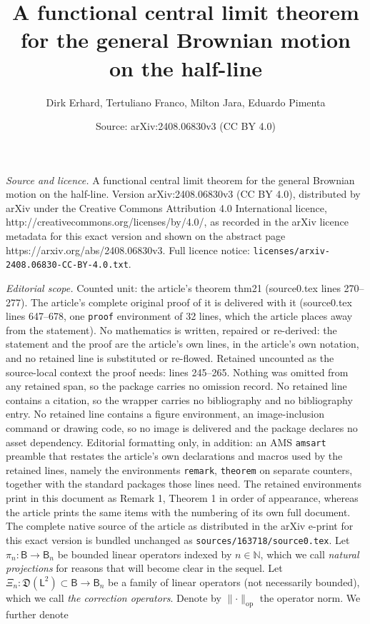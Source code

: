 \documentclass[10pt,a4paper]{amsart}
\title{A functional central limit theorem for the general Brownian motion on the half-line}
\author{Dirk Erhard, Tertuliano Franco, Milton Jara, Eduardo Pimenta}
\date{Source: arXiv:2408.06830v3 (CC BY 4.0)}
\newcommand{\bb}[1]{{\mathbb #1}}
\newcommand{\mf}[1]{{\mathfrak #1}}
\newcommand{\msf}[1]{{\mathsf #1}}
\newcommand{\norm}[1]{\lVert#1\rVert}
\begin{document}
\maketitle

\noindent\emph{Source and licence.} A functional central limit theorem for the general Brownian motion on the half-line. Version arXiv:2408.06830v3 (CC BY 4.0), distributed by arXiv under the Creative Commons Attribution 4.0 International licence, http://creativecommons.org/licenses/by/4.0/, as recorded in the arXiv licence metadata for this exact version and shown on the abstract page https://arxiv.org/abs/2408.06830v3. Full licence notice: \texttt{licenses/arxiv-2408.06830-CC-BY-4.0.txt}.\par\smallskip

\noindent\textit{Editorial scope.} Counted unit: the article's theorem thm21 (source0.tex lines 270--277). The article's complete original proof of it is delivered with it (source0.tex lines 647--678, one \texttt{proof} environment of 32 lines, which the article places away from the statement). No mathematics is written, repaired or re-derived: the statement and the proof are the article's own lines, in the article's own notation, and no retained line is substituted or re-flowed.  Retained uncounted as the source-local context the proof needs: lines 245--265.  Nothing was omitted from any retained span, so the package carries no omission record.  No retained line contains a citation, so the wrapper carries no bibliography and no bibliography entry.  No retained line contains a figure environment, an image-inclusion command or drawing code, so no image is delivered and the package declares no asset dependency.  Editorial formatting only, in addition: an AMS \texttt{amsart} preamble that restates the article's own declarations and macros used by the retained lines, namely the environments \texttt{remark}, \texttt{theorem} on separate counters, together with the standard packages those lines need.  The retained environments print in this document as Remark 1, Theorem 1 in order of appearance, whereas the article prints the same items with the numbering of its own full document.  The complete native source of the article as distributed in the arXiv e-print for this exact version is bundled unchanged as \texttt{sources/163718/source0.tex}.
	Let $\pi_n : \msf{B} \to \msf{B}_n$ be bounded linear operators indexed by $n \in \bb{N}$, which we call \textit{natural projections} for reasons that will become clear in the sequel.
	Let  $\Xi_n : \mf{D}(\msf{L}^2)\subset \msf{B} \to \msf{B}_n$ be a family of linear operators (not necessarily bounded), which we call \textit{the correction operators}. Denote by $\norm{\cdot}_\text{op}$ the operator norm. We further denote
\end{document}
